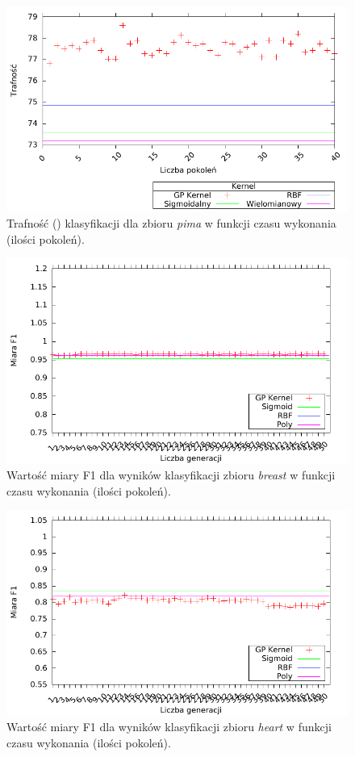 	\begin{figure}
		\includegraphics[scale=0.90]{figures/results/accuracy/accuracy-pima-diabetes}
		\caption{Trafność () klasyfikacji dla zbioru \emph{pima} w funkcji czasu wykonania (ilości pokoleń).\label{fig:acc-pima}}
	\end{figure} 
	
	\begin{figure}
		\includegraphics[scale=0.90]{figures/results/f1/f1-breast}
		\caption{Wartość miary F1 dla wyników klasyfikacji zbioru \emph{breast} w funkcji czasu wykonania (ilości pokoleń).\label{fig:f1-breast}}
	\end{figure}
	
	\begin{figure}
		\includegraphics[scale=0.90]{figures/results/f1/f1-heart}
		\caption{Wartość miary F1 dla wyników klasyfikacji zbioru \emph{heart} w funkcji czasu wykonania (ilości pokoleń).\label{fig:f1-heart}}
	\end{figure}
	
